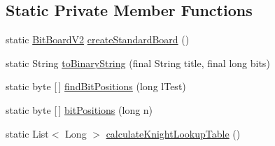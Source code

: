 \subsection*{Static Private Member Functions}
\begin{DoxyCompactItemize}
\item 
static \mbox{\hyperlink{classcom_1_1chess_1_1engine_1_1bitboards_1_1_bit_board_v2}{Bit\+Board\+V2}} \mbox{\hyperlink{classcom_1_1chess_1_1engine_1_1bitboards_1_1_bit_board_v2_a0aa03786a45233d6d52263f913f94313}{create\+Standard\+Board}} ()
\item 
static String \mbox{\hyperlink{classcom_1_1chess_1_1engine_1_1bitboards_1_1_bit_board_v2_a978e497399ee4f9738f7790325007abc}{to\+Binary\+String}} (final String title, final long bits)
\item 
static byte \mbox{[}$\,$\mbox{]} \mbox{\hyperlink{classcom_1_1chess_1_1engine_1_1bitboards_1_1_bit_board_v2_af79571d88168f84d582c10bda4288988}{find\+Bit\+Positions}} (long l\+Test)
\item 
static byte \mbox{[}$\,$\mbox{]} \mbox{\hyperlink{classcom_1_1chess_1_1engine_1_1bitboards_1_1_bit_board_v2_ab28101b42557a49a5024143c009845e1}{bit\+Positions}} (long n)
\item 
static List$<$ Long $>$ \mbox{\hyperlink{classcom_1_1chess_1_1engine_1_1bitboards_1_1_bit_board_v2_a53df35e5088404ff0b13a68e8c0c2cd5}{calculate\+Knight\+Lookup\+Table}} ()
\end{DoxyCompactItemize}
